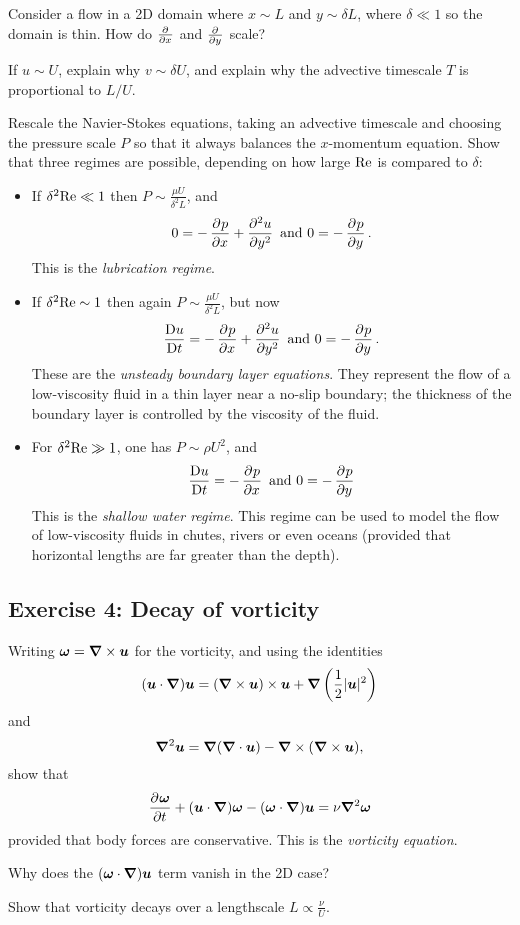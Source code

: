 \documentclass{article}
\begin{document}
Consider a flow in a 2D domain where $x\sim L$ and $y\sim\delta L$, where
$\delta\ll1$ so the domain is thin. How do $\pd{}{x}$ and $\pd{}{y}$ scale?

If $u\sim U$, explain why $v\sim\delta U$, and explain why the advective timescale $T$ is proportional to $L/U$. 

Rescale the Navier-Stokes equations, taking an advective timescale and choosing
the pressure scale $P$ so that it always balances the $x$-momentum equation.
Show that three regimes are possible, depending on how large $\mathrm{Re}$ is compared
to $\delta$:
\begin{itemize}
    \item If $\delta^2\mathrm{Re} \ll 1$ then $P\sim\frac{\mu U}{\delta^2L}$, and
    $$ 0 = -\dpd{p}{x} + \dpd[2]{u}{y} \text{ and } 0 = -\dpd{p}{y}. $$
    This is the \textit{lubrication regime}. 
    \item If $\delta^2\mathrm{Re}\sim1$ then again $P\sim\frac{\mu U}{\delta^2L}$, but
    now 
    $$ \DDt{u} = -\dpd{p}{x} + \dpd[2]{u}{y} \text{ and } 0 = -\dpd{p}{y}. $$
    These are the \textit{unsteady boundary layer equations}. They represent the
    flow of a low-viscosity fluid in a thin layer near a no-slip boundary; the
    thickness of the boundary layer is controlled by the viscosity of the fluid.
    \item For $\delta^2\mathrm{Re}\gg1$, one has $P\sim\rho U^2$, and 
    $$ \DDt{u} = -\dpd{p}{x} \text{ and } 0 = -\dpd{p}{y} $$
    This is the \textit{shallow water regime}. This regime can be used to model
    the flow of low-viscosity fluids in chutes, rivers or even oceans (provided
    that horizontal lengths are far greater than the depth).
\end{itemize}

\subsection{Exercise 4: Decay of vorticity}

Writing $\boldsymbol{\omega} = \boldsymbol{\nabla}\times\boldsymbol{u}$ for the vorticity, and using the identities
$$ (\boldsymbol{u}\cdot\boldsymbol{\nabla})\boldsymbol{u} = (\boldsymbol{\nabla}\times\boldsymbol{u})\times\boldsymbol{u} + \boldsymbol{\nabla}\left(\frac{1}{2}|\boldsymbol{u}|^2\right) $$
and
$$ \boldsymbol{\nabla}^2\boldsymbol{u} = \boldsymbol{\nabla}(\boldsymbol{\nabla}\cdot\boldsymbol{u}) - \boldsymbol{\nabla}\times(\boldsymbol{\nabla}\times\boldsymbol{u}), $$
show that
$$ \dpd{\bs{\omega}}{t} + (\bs{u}\cdot\grad)\bs{\omega} - (\bs{\omega}\cdot\grad)\bs{u} = \nu\grad^2\bs{\omega} $$
provided that body forces are conservative. This is the \textit{vorticity equation}.

Why does the $(\boldsymbol{\omega}\cdot\boldsymbol{\nabla})\boldsymbol{u}$ term vanish in the 2D case? 

Show that vorticity decays over a lengthscale $L\propto\frac{\nu}{U}$.
\end{document}
